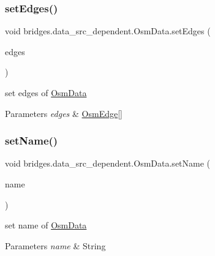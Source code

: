 \subsubsection{\texorpdfstring{set\+Edges()}{setEdges()}}
{\footnotesize\ttfamily void bridges.\+data\+\_\+src\+\_\+dependent.\+Osm\+Data.\+set\+Edges (\begin{DoxyParamCaption}\item[{\mbox{\hyperlink{classbridges_1_1data__src__dependent_1_1_osm_edge}{Osm\+Edge}} \mbox{[}$\,$\mbox{]}}]{edges }\end{DoxyParamCaption})}

set edges of \mbox{\hyperlink{classbridges_1_1data__src__dependent_1_1_osm_data}{Osm\+Data}} 
\begin{DoxyParams}{Parameters}
{\em edges} & \mbox{\hyperlink{classbridges_1_1data__src__dependent_1_1_osm_edge}{Osm\+Edge}}\mbox{[}\mbox{]} \\
\hline
\end{DoxyParams}
\mbox{\label{classbridges_1_1data__src__dependent_1_1_osm_data_abdc3131be4ca17fcf53a5728a7932bda}} 
\subsubsection{\texorpdfstring{set\+Name()}{setName()}}
{\footnotesize\ttfamily void bridges.\+data\+\_\+src\+\_\+dependent.\+Osm\+Data.\+set\+Name (\begin{DoxyParamCaption}\item[{String}]{name }\end{DoxyParamCaption})}

set name of \mbox{\hyperlink{classbridges_1_1data__src__dependent_1_1_osm_data}{Osm\+Data}} 
\begin{DoxyParams}{Parameters}
{\em name} & String \\
\hline
\end{DoxyParams}
\mbox{\label{classbridges_1_1data__src__dependent_1_1_osm_data_ad31b467d79dd0b76f75f93b5e192e1e3}} 
